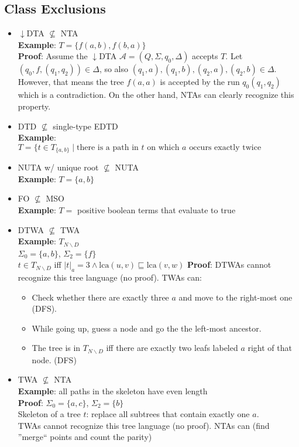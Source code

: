 \documentclass{article}
\begin{document}
\subsection{Class Exclusions}
\begin{itemize}
	\item $\downarrow$DTA $\not\subseteq$ NTA \\
		\textbf{Example}: $T = \{ f(a, b), f(b, a) \}$ \\
		\textbf{Proof}: Assume the $\downarrow$DTA $\mathcal{A} = (Q, \Sigma, q_0, \Delta)$ accepts $T$. Let $(q_0, f, (q_1, q_2)) \in \Delta$, so also $(q_1, a), (q_1, b), (q_2, a), (q_2, b) \in \Delta$. However, that means the tree $f(a, a)$ is accepted by the run $q_0(q_1, q_2)$ which is a contradiction. On the other hand, NTAs can clearly recognize this property.
	\item DTD $\not\subseteq$ single-type EDTD \\
		\textbf{Example}: $T = \{ t \in T_{\{a,b\}} \mid \text{there is a path in } t \text{ on which } a \text{ occurs exactly twice}$
	\item NUTA w/ unique root $\not\subseteq$ NUTA \\
		\textbf{Example}: $T = \{a, b\}$
	\item FO $\not\subseteq$ MSO \\
		\textbf{Example}: $T = $ positive boolean terms that evaluate to true %
	\item DTWA $\not\subseteq$ TWA \\
		\textbf{Example}: $T_{N \backslash D}$ \\
			$\Sigma_0 = \{a, b\}$, $\Sigma_2 = \{f\}$ \\
			$t \in T_{N \backslash D}$ iff $|t|_a = 3 \land \text{lca}(u, v) \sqsubseteq \text{lca}(v, w)$
		\textbf{Proof}: DTWAs cannot recognize this tree language (no proof). TWAs can:
			\begin{itemize}
				\item Check whether there are exactly three $a$ and move to the right-most one (DFS).
				\item While going up, guess a node and go the the left-most ancestor.
				\item The tree is in $T_{N \backslash D}$ iff there are exactly two leafs labeled $a$ right of that node. (DFS)
			\end{itemize}
	\item TWA $\not\subseteq$ NTA \\
		\textbf{Example}: all paths in the skeleton have even length \\
		\textbf{Proof}: $\Sigma_0 = \{a, c\}$, $\Sigma_2 = \{b\}$ \\
			Skeleton of a tree $t$: replace all subtrees that contain exactly one $a$. \\
			TWAs cannot recognize this tree language (no proof). NTAs can (find ''merge`` points and count the parity)
\end{itemize}
\end{document}
